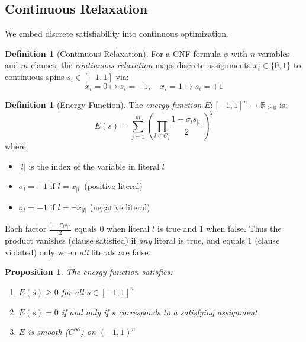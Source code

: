 \documentclass[11pt,a4paper]{article}
\theoremstyle{plain}
\newtheorem{proposition}[theorem]{Proposition}
\theoremstyle{definition}
\newtheorem{definition}[theorem]{Definition}
\theoremstyle{remark}
\newcommand{\R}{\mathbb{R}}
\begin{document}
\subsection{Continuous Relaxation}

We embed discrete satisfiability into continuous optimization.

\begin{definition}[Continuous Relaxation]\label{def:relaxation}
For a CNF formula $\phi$ with $n$ variables and $m$ clauses, the \emph{continuous relaxation} maps discrete assignments $x_i \in \{0,1\}$ to continuous spins $s_i \in [-1, 1]$ via:
\begin{equation}
    x_i = 0 \mapsto s_i = -1, \quad x_i = 1 \mapsto s_i = +1
\end{equation}
\end{definition}

\begin{definition}[Energy Function]\label{def:energy}
The \emph{energy function} $E: [-1,1]^n \to \R_{\geq 0}$ is:
\begin{equation}
    E(s) = \sum_{j=1}^{m} \left(\prod_{l \in C_j} \frac{1 - \sigma_l s_{|l|}}{2}\right)^2
\end{equation}
where:
\begin{itemize}
    \item $|l|$ is the index of the variable in literal $l$
    \item $\sigma_l = +1$ if $l = x_{|l|}$ (positive literal)
    \item $\sigma_l = -1$ if $l = \neg x_{|l|}$ (negative literal)
\end{itemize}
Each factor $\frac{1 - \sigma_l s_{|l|}}{2}$ equals $0$ when literal $l$ is true and $1$ when false. Thus the product vanishes (clause satisfied) if \emph{any} literal is true, and equals $1$ (clause violated) only when \emph{all} literals are false.
\end{definition}

\begin{proposition}
The energy function satisfies:
\begin{enumerate}
    \item $E(s) \geq 0$ for all $s \in [-1,1]^n$
    \item $E(s) = 0$ if and only if $s$ corresponds to a satisfying assignment
    \item $E$ is smooth ($C^\infty$) on $(-1,1)^n$
\end{enumerate}
\end{proposition}
\end{document}
